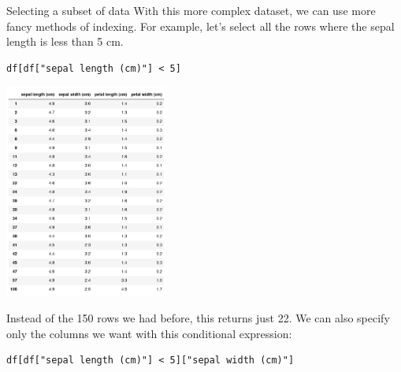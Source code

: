 \documentclass[10pt]{beamer}
\begin{document}
\begin{frame}[label={sec:orgf74367e},fragile]{Selecting a subset of data}
 With this more complex dataset, we can use more fancy methods of indexing. For
example, let's select all the rows where the sepal length is less than 5 cm.

\begin{verbatim}
df[df["sepal length (cm)"] < 5]
\end{verbatim}

\begin{center}
\includegraphics[width=0.4\textwidth]{images/subset.png}
\end{center}

Instead of the 150 rows we had before, this returns just 22. We can also specify
only the columns we want with this conditional expression:

\begin{verbatim}
df[df["sepal length (cm)"] < 5]["sepal width (cm)"]
\end{verbatim}
\end{frame}
\end{document}
